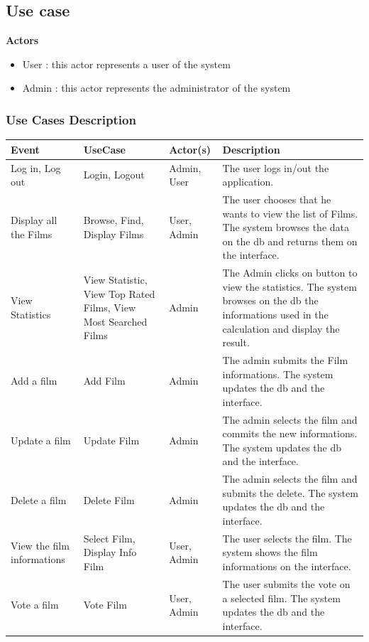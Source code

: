 \documentclass[a4paper, oneside]{article}
\begin{document}
\clearpage

\subsection{Use case}

\textbf{Actors}
\begin{itemize}
\item{User : this actor represents a user of the system}
\item{Admin : this actor represents the administrator of the system}
\end{itemize}

\subsubsection{Use Cases Description}
\begin{table}[h]
\centering
\begin{tabular}{p{}p{}lp{}}
\hline
\textbf{Event} & \textbf{UseCase} & \textbf{Actor(s)} & \textbf{Description}\\ \hline
Log in, Log out & Login,  Logout & Admin, User & The user logs in/out the application.\\ \hline
Display all the Films & Browse, Find, Display Films & User, Admin & The user chooses that he wants to view the list of Films. The system browses the data on the db and returns them on the interface.\\ \hline
View Statistics & View Statistic, View Top Rated Films, View Most Searched Films & Admin & The Admin clicks on button to view the statistics. The system browses on the db the informations used in the calculation and display the result.\\ \hline
Add a film & Add Film & Admin & The admin submits the Film informations. The system updates the db and the interface.\\ \hline
Update a film & Update Film & Admin & The admin selects the film and commits the new informations. The system updates the db and the interface.\\ \hline
Delete a film & Delete Film & Admin & The admin selects the film and submits the delete. The system updates the db and the interface.\\ \hline
View the film informations & Select Film, Display Info Film & User, Admin & The user selects the film. The system shows the film informations on the interface.\\ \hline
Vote a film & Vote Film & User, Admin & The user submits the vote on a selected film. The system updates the db and the interface.\\ \hline
\end{tabular}
\end{table}
\end{document}
